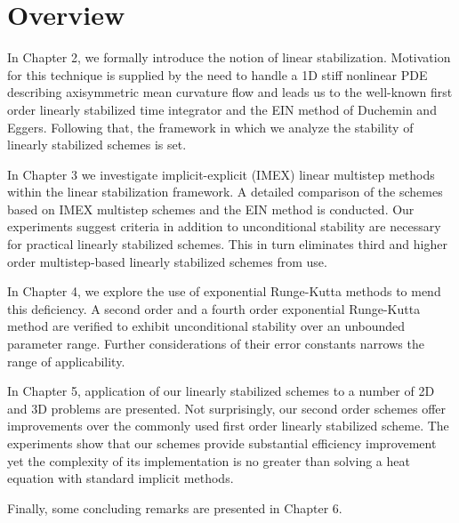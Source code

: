 \section{Overview}
In Chapter 2, we formally introduce the notion of linear stabilization. Motivation for this technique is supplied by the need to handle a 1D stiff nonlinear PDE describing axisymmetric mean curvature flow and leads us to the well-known first order linearly stabilized time integrator and the EIN method of Duchemin and Eggers. Following that, the framework in which we analyze the stability of linearly stabilized schemes is set. 

In Chapter 3 we investigate implicit-explicit (IMEX) linear multistep methods within the linear stabilization framework. A detailed comparison of the schemes based on IMEX multistep schemes and the EIN method is conducted. Our experiments suggest criteria in addition to unconditional stability are necessary for practical linearly stabilized schemes. This in turn eliminates third and higher order multistep-based linearly stabilized schemes from use. 

In Chapter 4, we explore the use of exponential Runge-Kutta methods to mend this deficiency. A second order and a fourth order exponential Runge-Kutta method are verified to exhibit unconditional stability over an unbounded parameter range. Further considerations of their error constants narrows the range of applicability.

In Chapter 5, application of our linearly stabilized schemes to a number of 2D and 3D problems are presented. Not surprisingly, our second order schemes offer improvements over the commonly used first order linearly stabilized scheme. The experiments show that our schemes provide substantial efficiency improvement yet the complexity of its implementation is no greater than solving a heat equation with standard implicit methods.

Finally, some concluding remarks are presented in Chapter 6.  
 